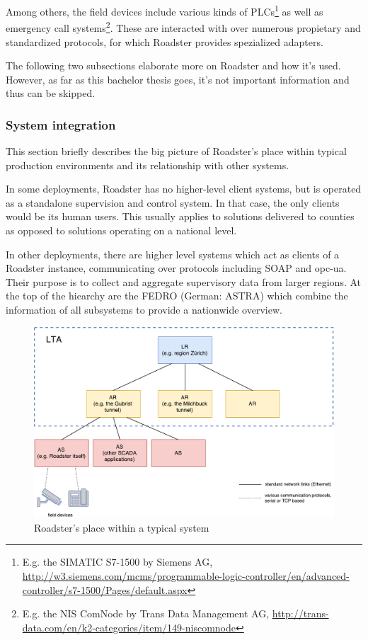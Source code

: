 Among others, the field devices include various kinds of \glspl{PLC}\footnote{E.g.
the SIMATIC S7-1500 by Siemens AG,
\url{http://w3.siemens.com/mcms/programmable-logic-controller/en/advanced-controller/s7-1500/Pages/default.aspx}}
as well as emergency call systems\footnote{E.g. the NIS ComNode by Trans Data
Management AG,
\url{http://trans-data.com/en/k2-categories/item/149-niscomnode}}.
These are interacted with over numerous propietary and standardized protocols,
for which Roadster provides spezialized adapters.

The following two subsections elaborate more on Roadster and how it's used.
However, as far as this bachelor thesis goes, it's not important information
and thus can be skipped.

\subsubsection{System integration}\label{sec:scope:sys-integration}
This section briefly describes the big picture of Roadster's place within
typical production environments and its relationship with other systems.

In some deployments, Roadster has no higher-level client systems, but is
operated as a standalone supervision and control system. In that case, the only
clients would be its human users. This usually applies to solutions delivered
to counties as opposed to solutions operating on a national level.

In other deployments, there are higher level systems which act as clients of a Roadster instance, communicating over
protocols including \gls{SOAP} and \gls{opc-ua}. Their purpose is to
collect and aggregate supervisory data from larger regions. At the top of the
hiearchy are the \gls{FEDRO} (German: \gls{ASTRA}) which combine the information of all
subsystems to provide a nationwide overview.

\begin{figure}[]
	\includegraphics[width=\textwidth]{img/overall_system.pdf}
	\caption{Roadster's place within a typical system}
	\label{fig:roadster:overallsys}
\end{figure}

